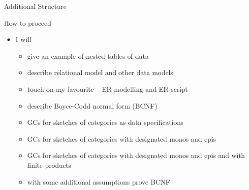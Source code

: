 \begin{frame}{Additional Structure}
\resizebox{11.3cm}{!}{

\featurelist
}
\end{frame}

\begin{frame}{How to proceed}
\begin{itemize}
\pause \item I will
\begin{itemize}
   \item give an example of nested tables of data
   \item describe relational model  and other data models 
   \pause \item touch on my favourite -- ER modelling and ER script
   \pause \item describe Boyce-Codd normal form (BCNF)
   \pause \item GCs for sketches of categories as data specifications 
   \pause \item GCs for sketches of categories with designated monos and epis
   \pause \item GCs for sketches of categories with designated monos and epis and with finite products
  \pause \item with some additional assumptions prove BCNF
\end{itemize}
\end{itemize}
\end{frame}

